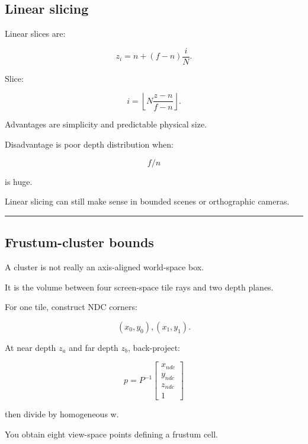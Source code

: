 \subsection{Linear slicing}\label{04-visual-computing-ii-ch040-linear-slicing}

\hypertarget{04-visual-computing-ii-ch040-linear-slicing}{}

Linear slices are:

\[
\boxed{
z_i=
n+
(f-n)\frac iN.
}
\]

Slice:

\[
\boxed{
i=
\left\lfloor
N
\frac{z-n}{f-n}
\right\rfloor.
}
\]

Advantages are simplicity and predictable physical size.

Disadvantage is poor depth distribution when:

\[
f/n
\]

is huge.

Linear slicing can still make sense in bounded scenes or orthographic cameras.

\begin{center}\rule{0.5\linewidth}{0.5pt}\end{center}

\subsection{Frustum-cluster bounds}\label{04-visual-computing-ii-ch040-frustum-cluster-bounds}

\hypertarget{04-visual-computing-ii-ch040-frustum-cluster-bounds}{}

A cluster is not really an axis-aligned world-space box.

It is the volume between four screen-space tile rays and two depth planes.

For one tile, construct NDC corners:

\[
(x_0,y_0),(x_1,y_1).
\]

At near depth \(z_a\) and far depth \(z_b\), back-project:

\[
p=
P^{-1}
\begin{bmatrix}
x_{ndc}\\
y_{ndc}\\
z_{ndc}\\
1
\end{bmatrix}
\]

then divide by homogeneous w.

You obtain eight view-space points defining a frustum cell.

